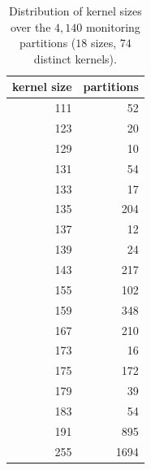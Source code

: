 \begin{table}[H]
\centering\small
\caption{Distribution of kernel sizes over the $4{,}140$ monitoring partitions ($18$ sizes, $74$ distinct kernels).}
\label{tab:design_sizes}
\begin{tabular}{rr}
\toprule
kernel size & partitions \\
\midrule
111 & 52 \\
123 & 20 \\
129 & 10 \\
131 & 54 \\
133 & 17 \\
135 & 204 \\
137 & 12 \\
139 & 24 \\
143 & 217 \\
155 & 102 \\
159 & 348 \\
167 & 210 \\
173 & 16 \\
175 & 172 \\
179 & 39 \\
183 & 54 \\
191 & 895 \\
255 & 1694 \\
\bottomrule
\end{tabular}
\end{table}

